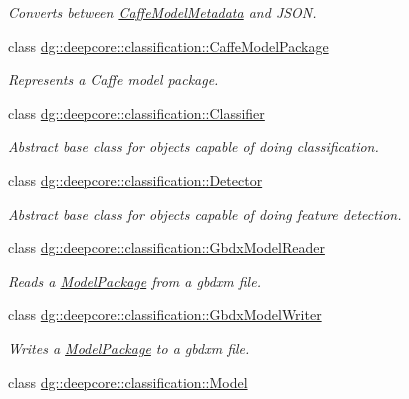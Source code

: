 \begin{DoxyCompactItemize}
\begin{DoxyCompactList}\small\item\em Converts between \hyperlink{structdg_1_1deepcore_1_1classification_1_1_caffe_model_metadata}{Caffe\+Model\+Metadata} and J\+S\+ON. \end{DoxyCompactList}\item 
class \hyperlink{classdg_1_1deepcore_1_1classification_1_1_caffe_model_package}{dg\+::deepcore\+::classification\+::\+Caffe\+Model\+Package}
\begin{DoxyCompactList}\small\item\em Represents a Caffe model package. \end{DoxyCompactList}\item 
class \hyperlink{classdg_1_1deepcore_1_1classification_1_1_classifier}{dg\+::deepcore\+::classification\+::\+Classifier}
\begin{DoxyCompactList}\small\item\em Abstract base class for objects capable of doing classification. \end{DoxyCompactList}\item 
class \hyperlink{classdg_1_1deepcore_1_1classification_1_1_detector}{dg\+::deepcore\+::classification\+::\+Detector}
\begin{DoxyCompactList}\small\item\em Abstract base class for objects capable of doing feature detection. \end{DoxyCompactList}\item 
class \hyperlink{classdg_1_1deepcore_1_1classification_1_1_gbdx_model_reader}{dg\+::deepcore\+::classification\+::\+Gbdx\+Model\+Reader}
\begin{DoxyCompactList}\small\item\em Reads a \hyperlink{classdg_1_1deepcore_1_1classification_1_1_model_package}{Model\+Package} from a gbdxm file. \end{DoxyCompactList}\item 
class \hyperlink{classdg_1_1deepcore_1_1classification_1_1_gbdx_model_writer}{dg\+::deepcore\+::classification\+::\+Gbdx\+Model\+Writer}
\begin{DoxyCompactList}\small\item\em Writes a \hyperlink{classdg_1_1deepcore_1_1classification_1_1_model_package}{Model\+Package} to a gbdxm file. \end{DoxyCompactList}\item 
class \hyperlink{classdg_1_1deepcore_1_1classification_1_1_model}{dg\+::deepcore\+::classification\+::\+Model}

\end{DoxyCompactItemize}
